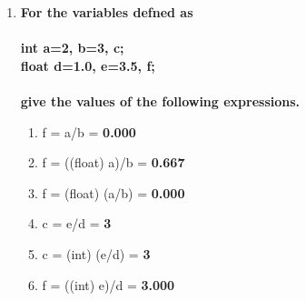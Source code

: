\documentclass{article}
\begin{document}
\begin{enumerate}[label=\textbf{\arabic*})]
    \pagebreak
    \item \textbf{For the variables defned as \\ \\
    int a=2, b=3, c; \\
    float d=1.0, e=3.5, f; \\ \\
    give the values of the following expressions.}
    \begin{enumerate}[label=\textbf{\alph*}.]
        \item f = a/b = \textbf{0.000}
        \item f = ((float) a)/b = \textbf{0.667}
        \item f = (float) (a/b) = \textbf{0.000}
        \item c = e/d = \textbf{3}
        \item c = (int) (e/d) = \textbf{3}
        \item f = ((int) e)/d = \textbf{3.000}
    \end{enumerate}



\end{enumerate}
\end{document}
